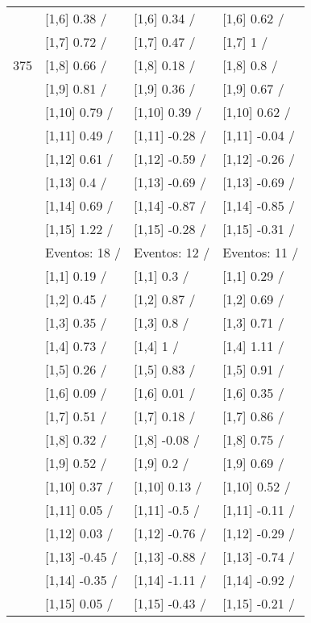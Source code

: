 \begin{table}
\begin{tabular}[t]{llll}
 & {}[1,6] 0.38  / & {}[1,6] 0.34  / & {}[1,6] 0.62  /\\
 & {}[1,7] 0.72  / & {}[1,7] 0.47  / & {}[1,7] 1  /\\
375 & {}[1,8] 0.66  / & {}[1,8] 0.18  / & {}[1,8] 0.8  /\\
\addlinespace
 & {}[1,9] 0.81  / & {}[1,9] 0.36  / & {}[1,9] 0.67  /\\
 & {}[1,10] 0.79  / & {}[1,10] 0.39  / & {}[1,10] 0.62  /\\
 & {}[1,11] 0.49  / & {}[1,11] -0.28  / & {}[1,11] -0.04  /\\
 & {}[1,12] 0.61  / & {}[1,12] -0.59  / & {}[1,12] -0.26  /\\
 & {}[1,13] 0.4  / & {}[1,13] -0.69  / & {}[1,13] -0.69  /\\
\addlinespace
 & {}[1,14] 0.69  / & {}[1,14] -0.87  / & {}[1,14] -0.85  /\\
 & {}[1,15] 1.22  / & {}[1,15] -0.28  / & {}[1,15] -0.31  /\\
 & Eventos:  18 / & Eventos:  12 / & Eventos:  11 /\\
 & {}[1,1] 0.19  / & {}[1,1] 0.3  / & {}[1,1] 0.29  /\\
 & {}[1,2] 0.45  / & {}[1,2] 0.87  / & {}[1,2] 0.69  /\\
\addlinespace
 & {}[1,3] 0.35  / & {}[1,3] 0.8  / & {}[1,3] 0.71  /\\
 & {}[1,4] 0.73  / & {}[1,4] 1  / & {}[1,4] 1.11  /\\
 & {}[1,5] 0.26  / & {}[1,5] 0.83  / & {}[1,5] 0.91  /\\
 & {}[1,6] 0.09  / & {}[1,6] 0.01  / & {}[1,6] 0.35  /\\
 & {}[1,7] 0.51  / & {}[1,7] 0.18  / & {}[1,7] 0.86  /\\
\addlinespace
500 & {}[1,8] 0.32  / & {}[1,8] -0.08  / & {}[1,8] 0.75  /\\
 & {}[1,9] 0.52  / & {}[1,9] 0.2  / & {}[1,9] 0.69  /\\
 & {}[1,10] 0.37  / & {}[1,10] 0.13  / & {}[1,10] 0.52  /\\
 & {}[1,11] 0.05  / & {}[1,11] -0.5  / & {}[1,11] -0.11  /\\
 & {}[1,12] 0.03  / & {}[1,12] -0.76  / & {}[1,12] -0.29  /\\
\addlinespace
 & {}[1,13] -0.45  / & {}[1,13] -0.88  / & {}[1,13] -0.74  /\\
 & {}[1,14] -0.35  / & {}[1,14] -1.11  / & {}[1,14] -0.92  /\\
 & {}[1,15] 0.05  / & {}[1,15] -0.43  / & {}[1,15] -0.21  /\\
\bottomrule
\end{tabular}
\end{table}
